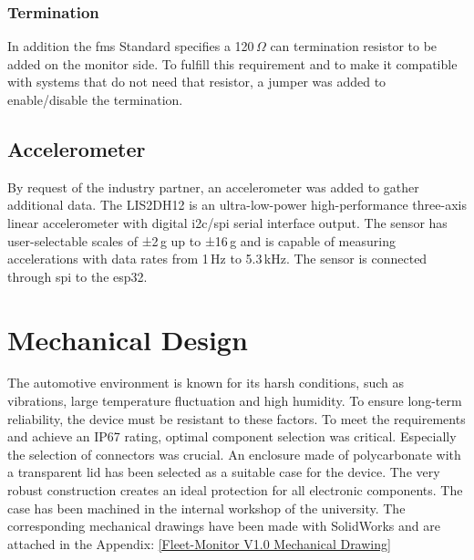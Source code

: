 \subsubsection{Termination}
In addition the \acrshort{fms} Standard specifies a 120\,$\Omega$ \acrshort{can} termination resistor to be added on the monitor side. To fulfill this requirement and to make it compatible with systems that do not need that resistor, a jumper was added to enable/disable the termination. 

\subsection{Accelerometer}
By request of the industry partner, an accelerometer was added to gather additional data. The LIS2DH12 is an ultra-low-power high-performance three-axis linear accelerometer with digital \acrshort{i2c}/\acrshort{spi} serial interface output. The sensor has user-selectable scales of ±2\,g up to ±16\,g and is capable of measuring accelerations with data rates from 1\,Hz to 5.3\,kHz. The sensor is connected through \acrshort{spi} to the \gls{esp32}.

\newpage
\section{Mechanical Design}
The automotive environment is known for its harsh conditions, such as vibrations, large temperature fluctuation and high humidity. To ensure long-term reliability, the device must be resistant to these factors. To meet the requirements and achieve an IP67 rating, optimal component selection was critical. Especially the selection of connectors was crucial. 
An enclosure made of polycarbonate with a transparent lid has been selected as a suitable case for the device. The very robust construction creates an ideal protection for all electronic components.\newline
The case has been machined in the internal workshop of the university. The corresponding mechanical drawings have been made with SolidWorks and are attached in the Appendix: \ref{Fleet-Monitor V1.0 Mechanical Drawing}

